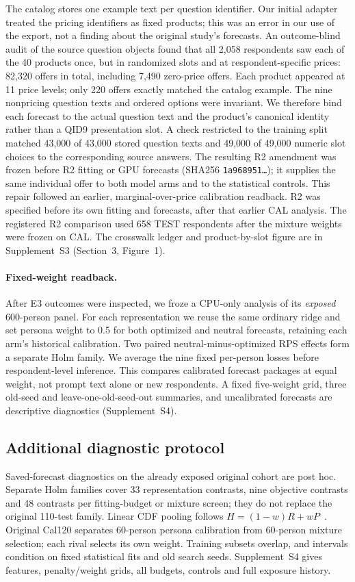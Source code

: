 \documentclass[10pt,twocolumn]{article}
\newcommand{\ArchivalApp}{Supplement~S4}
\newcommand{\CurrentApp}{Supplement~S3}
\begin{document}
The catalog stores one example text per question identifier. Our initial
adapter treated the pricing identifiers as fixed products; this was an error
in our use of the export, not a finding about the original study's forecasts.
An outcome-blind audit
of the source question objects found that all 2,058 respondents saw each of
the 40 products once, but in randomized slots and at respondent-specific
prices: 82,320 offers in total, including 7,490 zero-price offers. Each
product appeared at 11 price levels; only 220 offers exactly matched the
catalog example. The nine nonpricing question texts and ordered options were
invariant. We therefore bind each forecast to the actual question text and
the product's canonical identity rather than a QID9 presentation slot. A
check restricted to the training split matched 43,000 of 43,000 stored question texts and
49,000 of 49,000 numeric slot choices to the corresponding source answers.
The resulting R2 amendment was frozen before R2 fitting or GPU forecasts
(SHA256 \texttt{1a968951\ldots}); it supplies the same individual offer to
both model arms and to the statistical controls. This repair followed an
earlier, marginal-over-price calibration readback. R2 was specified before
its own fitting and forecasts, after that earlier CAL analysis. The registered R2 comparison used 658 TEST respondents after the
mixture weights were frozen on CAL.
The crosswalk ledger and product-by-slot figure are in \CurrentApp{}
(Section~3, Figure~1).

\paragraph{Fixed-weight readback.}
After E3 outcomes were inspected, we froze a CPU-only analysis of its
\emph{exposed} 600-person panel. For each representation we reuse the same
ordinary ridge and set persona weight to 0.5 for both optimized and neutral
forecasts, retaining each arm's historical calibration. Two paired
neutral-minus-optimized RPS effects form a separate Holm family. We average
the nine fixed per-person losses before respondent-level inference. This
compares calibrated forecast packages at equal weight, not prompt text alone
or new respondents. A fixed five-weight grid, three old-seed and
leave-one-old-seed-out summaries, and uncalibrated forecasts are descriptive
diagnostics (\ArchivalApp).

\subsection{Additional diagnostic protocol}\label{sec:diagnostic}
Saved-forecast diagnostics on the already exposed original cohort are post
hoc. Separate Holm families cover 33 representation contrasts, nine objective
contrasts and 48 contrasts per fitting-budget or mixture screen; they do not
replace the original 110-test family. Linear CDF pooling follows
$H=(1-w)R+wP$~\cite{gneiting2011combining}. Original Cal120 separates
60-person persona calibration from 60-person mixture selection; each rival
selects its own weight. Training subsets overlap, and intervals condition on
fixed statistical fits and old search seeds. \ArchivalApp{} gives features,
penalty/weight grids, all budgets, controls and full exposure history.
\end{document}
